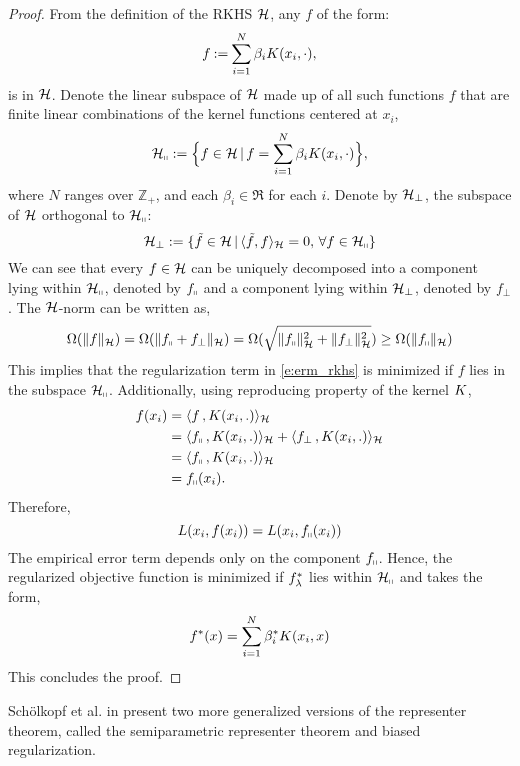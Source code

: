 \begin{proof}
From the definition of the RKHS ${\cal H}$, any $f$ of the form:
\[
f \mathbin{:=} \sum_{i=1}^N  
\beta_i K(x_i,\cdot),
\]
is in ${\cal H}$. 	
Denote the linear subspace of ${\cal H}$ made up of all such functions $f$ that are finite linear combinations of the kernel functions centered at $x_i$,
\[
{\cal H}_\shortparallel := \Bigl\{f \in {\cal H}\, |\, f = \sum_{i=1}^N  \beta_i K(x_i,\cdot) \Bigr\},
\]
where $N$ ranges over $\mathbb{Z}_+$, and  each $\beta_i \in \Re$ for each $i$. Denote by ${\cal H}_{\perp}$, the subspace of ${\cal H}$ orthogonal to ${\cal H}_\shortparallel$:
\[
{\cal H}_\perp : = \{ \tilde f \in {\cal H}\,| \, \langle \tilde f , f \rangle_{\cal H} = 0 ,\, \forall f \in {\cal H}_\shortparallel \}
\]
We can see that every $f \in {\cal H}$ can be uniquely decomposed into a component lying within ${\cal H}_\shortparallel$, denoted by $f_\shortparallel$ and a component lying within ${\cal H}_\perp$, denoted by $f_\perp$.
The ${\cal H}$-norm can be written as,
\[
\Omega(\|f\|_{\cal H}) = \Omega( \|f_\shortparallel + f_\perp\|_{\cal H}) =\Omega( \sqrt{\|f_\shortparallel\|^2_{\cal H} + \|f_\perp\|^2_{\cal H}})  \geq \Omega(\|f_\shortparallel\|_{\cal H})
\]
This implies that the regularization term in \eqref{e:erm_rkhs} is minimized if $f$ lies in the subspace ${\cal H}_\shortparallel$.
Additionally, using reproducing property of the kernel $K$,
\[
\begin{aligned}
f(x_i) & =  \langle f \, , K(x_i,.) \rangle_{\cal H}\\
&  = \langle f_\shortparallel\, , K(x_i,.) \rangle_{\cal H} + \langle f_\perp \, , K(x_i,.) \rangle_{\cal H} \\
&  = \langle f_\shortparallel\, , K(x_i,.) \rangle_{\cal H} \\
&  = f_\shortparallel(x_i).
\end{aligned}
\]
Therefore,
\[
L(x_i, f(x_i)) = L(x_i, f_\shortparallel(x_i))
\]
The empirical error term depends only on the component $f_\shortparallel$. Hence, the regularized objective function is minimized if $f_\lambda^*$ lies within ${\cal H}_\shortparallel$ and takes the form,
\[
f^*(x) = \sum_{i=1}^N  \beta_i^*  K(x_i, x)
\]
This concludes the proof. 
\end{proof}
Sch\"{o}lkopf et al. in \cite{schhersmo01} present two more generalized versions of the representer theorem, called the semiparametric representer theorem and biased regularization.
